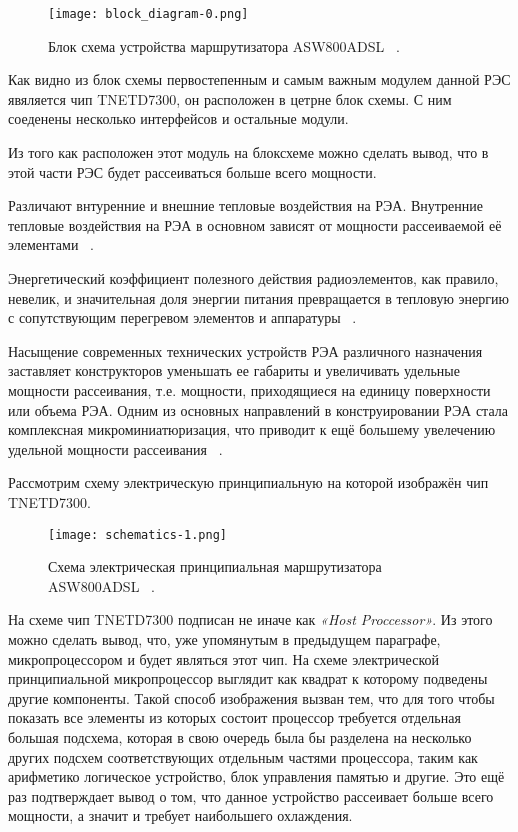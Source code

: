 \begin{figure}[h] %
  \centering
\texttt{[image: block\_diagram-0.png]}
\caption{Блок схема устройства маршрутизатора ASW800ADSL ~\cite{BLOCK-DIAGRAM}.}
\end{figure}
 
Как видно из блок схемы первостепенным и самым важным модулем данной
РЭС явяляется чип TNETD7300, он расположен в цетрне блок схемы. С ним
соеденены несколько интерфейсов и остальные модули.

Из того как расположен этот модуль на блоксхеме можно сделать вывод,
что в этой части РЭС будет рассеиваться больше всего мощности.

Различают внтуренние и внешние тепловые воздействия на РЭА.
Внутренние тепловые воздействия на РЭА в основном зависят от мощности
рассеиваемой её элементами ~\cite{Rotkop1976}.

Энергетический коэффициент полезного действия радиоэлементов, как
правило, невелик, и значительная доля энергии питания превращается в
тепловую энергию с сопутствующим перегревом элементов и аппаратуры
~\cite{Rotkop1976}.

Насыщение современных технических устройств РЭА различного назначения
заставляет конструкторов уменьшать ее габариты и увеличивать удельные
мощности рассеивания, т.е. мощности, приходящиеся на единицу
поверхности или объема РЭА. Одним из основных направлений в
конструировании РЭА стала комплексная микроминиатюризация, что
приводит к ещё большему увелечению удельной мощности рассеивания
~\cite{Rotkop1976}.

Рассмотрим схему электрическую принципиальную на которой изображён чип
TNETD7300.

\begin{figure}[h]
  \centering
  \texttt{[image: schematics-1.png]}
  \caption{Схема электрическая принципиальная
    маршрутизатора ASW800ADSL ~\cite{SCHEMATICS}.}
\end{figure}

На схеме чип TNETD7300 подписан не иначе как \textit{«Host Proccessor»}.
Из этого можно сделать вывод, что, уже упомянутым в предыдущем
параграфе, микропроцессором и будет являться этот чип.  На схеме
электрической принципиальной микропроцессор выглядит как квадрат к
которому подведены другие компоненты. Такой способ изображения вызван
тем, что для того чтобы показать все элементы из которых состоит
процессор требуется отдельная большая подсхема, которая в свою очередь
была бы разделена на несколько других подсхем соответствующих
отдельным частями процессора, таким как арифметико логическое
устройство, блок управления памятью и другие. Это ещё раз подтверждает
вывод о том, что данное устройство рассеивает больше всего мощности, а
значит и требует наибольшего охлаждения.

